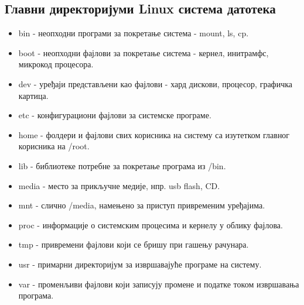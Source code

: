 \documentclass[a4paper,14pt]{article}
\begin{document}
\subsection{Главни директоријуми Linux система датотека}
\begin{itemize}
\item bin - неопходни програми за покретање система - mount, ls, cp.
\item boot - неопходни фајлови за покретање система - кернел, инитрамфс, микрокод процесора.
\item dev - уређаји представљени као фајлови - хард дискови, процесор, графичка картица.
\item etc - конфигурациони фајлови за системске програме.
\item home - фолдери и фајлови свих корисника на систему са изутетком главног корисника на /root.
\item lib - библиотеке потребне за покретање програма из /bin.
\item media - место за прикључне медије, нпр. usb flash, CD.
\item mnt - слично /media, намењено за приступ привременим уређајима.
\item proc - информације о системским процесима и кернелу у облику фајлова.
\item tmp - привремени фајлови који се бришу при гашењу рачунара.
\item usr - примарни директоријум за извршавајуће програме на систему.
\item var - променљиви фајлови који записују промене и податке током извршавања програма.
\end{itemize}
\newpage
\end{document}
